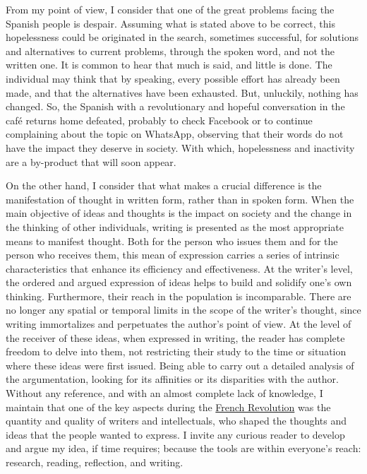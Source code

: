 \documentclass[]{book}
\begin{document}
From my point of view, I consider that one of the great problems facing the Spanish people is despair. Assuming what is stated above to be correct, this hopelessness could be originated in the search, sometimes successful, for solutions and alternatives to current problems, through the spoken word, and not the written one. It is common to hear that much is said, and little is done. The individual may think that by speaking, every possible effort has already been made, and that the alternatives have been exhausted. But, unluckily, nothing has changed. So, the Spanish with a revolutionary and hopeful conversation in the café returns home defeated, probably to check Facebook or to continue complaining about the topic on WhatsApp, observing that their words do not have the impact they deserve in society. With which, hopelessness and inactivity are a by-product that will soon appear.

On the other hand, I consider that what makes a crucial difference is the manifestation of thought in written form, rather than in spoken form. When the main objective of ideas and thoughts is the impact on society and the change in the thinking of other individuals, writing is presented as the most appropriate means to manifest thought. Both for the person who issues them and for the person who receives them, this mean of expression carries a series of intrinsic characteristics that enhance its efficiency and effectiveness. At the writer's level, the ordered and argued expression of ideas helps to build and solidify one's own thinking. Furthermore, their reach in the population is incomparable. There are no longer any spatial or temporal limits in the scope of the writer's thought, since writing immortalizes and perpetuates the author's point of view. At the level of the receiver of these ideas, when expressed in writing, the reader has complete freedom to delve into them, not restricting their study to the time or situation where these ideas were first issued. Being able to carry out a detailed analysis of the argumentation, looking for its affinities or its disparities with the author. Without any reference, and with an almost complete lack of knowledge, I maintain that one of the key aspects during the \href{https://en.wikipedia.org/wiki/French_Revolution}{French Revolution} was the quantity and quality of writers and intellectuals, who shaped the thoughts and ideas that the people wanted to express. I invite any curious reader to develop and argue my idea, if time requires; because the tools are within everyone's reach: research, reading, reflection, and writing.
\end{document}
